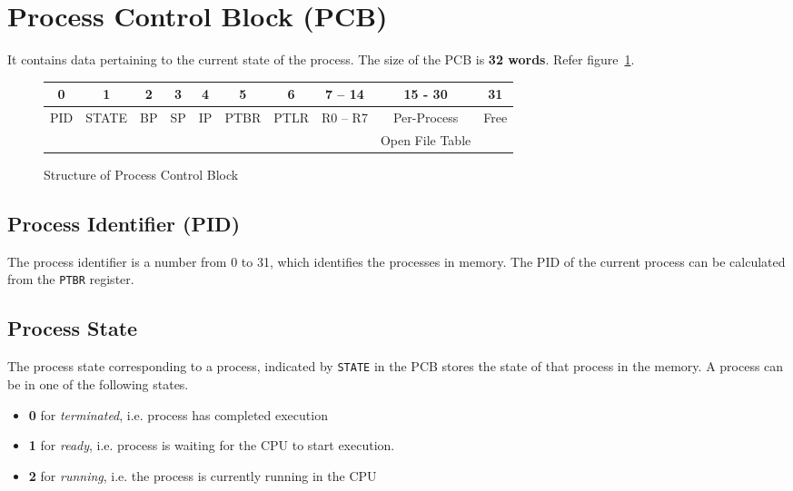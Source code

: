 \documentclass[10pt]{report}
\begin{document}
\section{Process Control Block (PCB)}
\label{sec:pcb}
It contains data pertaining to the current state of the process. The size of the PCB is \textbf{32 words}. Refer figure~\ref{fig:pcb}.\\


	\begin{figure}[htp!]
		\centering
		\begin{tabular}{|c|c|c|c|c|c|c|c|c|c|}
			\hline
			0 & 1 & 2 & 3 & 4 & 5 & 6 & 7 -- 14 & 15 - 30 &  31 \\
			\hline
			PID & STATE & BP & SP & IP & PTBR & PTLR & R0 -- R7 & Per-Process & Free\\ & & & & & & & & Open File Table &   \\
			\hline
		\end{tabular}
		\caption{Structure of Process Control Block}
		\label{fig:pcb}
	\end{figure}

 \subsection{Process Identifier (PID)}
 \label{sec:pid}
 The process identifier is a number from 0 to 31, which identifies the processes in memory. The PID of the current process can be calculated from the \texttt{PTBR} register.
 
	 \subsection{Process State} 
	 \label{sec:processstate}
	 The process state corresponding to a process, indicated by \texttt{STATE} in the PCB stores the state of that process in the memory. A process can be in one of the following states. 
	\begin{itemize}
		\item \textbf{0} for \textit{terminated}, i.e. process has completed execution
		\item \textbf{1} for \textit{ready}, i.e. process is waiting for the CPU to start execution.
		\item \textbf{2} for \textit{running}, i.e. the process is currently running in the CPU
	\end{itemize}
	
\end{document}
